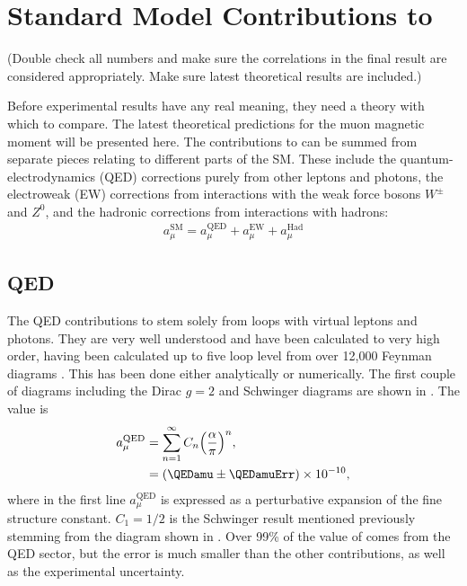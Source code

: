 \section{Standard Model Contributions to \amu}
\label{sec:Theory}

(Double check all numbers and make sure the correlations in the final result are considered appropriately. Make sure latest theoretical results are included.)

Before experimental results have any real meaning, they need a theory with which to compare. The latest theoretical predictions for the muon magnetic moment will be presented here. The contributions to \amu can be summed from separate pieces relating to different parts of the SM. These include the quantum-electrodynamics (QED) corrections purely from other leptons and photons, the electroweak (EW) corrections from interactions with the weak force bosons $W^{\pm}$ and $Z^{0}$, and the hadronic corrections from interactions with hadrons: 
		\begin{align}
            a_{\mu}^{\text{SM}} = a_{\mu}^{\text{QED}} + a_{\mu}^{\text{EW}} + a_{\mu}^{\text{Had}}
		\end{align}


\subsection{QED}
\label{subsec:QED}

The QED contributions to \amu stem solely from loops with virtual leptons and photons. They are very well understood and have been calculated to very high order, having been calculated up to five loop level from over 12,000 Feynman diagrams \cite{Kinoshita1,Kinoshita2}. This has been done either analytically or numerically. The first couple of diagrams including the Dirac $g = 2$ and Schwinger diagrams are shown in . The value is
		\begin{equation}
		\begin{aligned}
            a_{\mu}^{\text{QED}} &= \sum_{n=1}^{\infty} C_{n} \Big( \frac{\alpha}{\pi} \Big)^{n}, \\
            					 &= (\QEDamu \pm \QEDamuErr) \times 10^{-10},
		\end{aligned}
		\end{equation}
where in the first line $a_{\mu}^{\text{QED}}$ is expressed as a perturbative expansion of the fine structure constant. $C_{1} = 1/2$ is the Schwinger result mentioned previously stemming from the diagram shown in . Over 99\% of the value of \amu comes from the QED sector, but the error is much smaller than the other contributions, as well as the experimental uncertainty.

